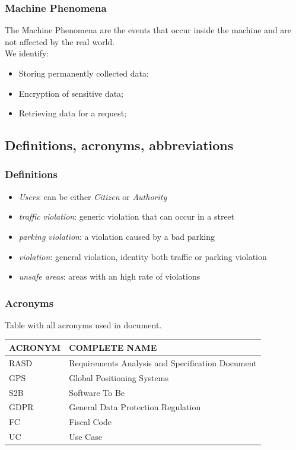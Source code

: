 \documentclass{article}
\begin{document}
\subsubsection{Machine Phenomena}
The Machine Phenomena are the events that occur inside the machine and are not affected by the real world.
\\We identify:
\begin{itemize}
    \item Storing permanently collected data;
    \item Encryption of sensitive data;
    \item Retrieving data for a request; 
\end{itemize} 

\subsection{Definitions, acronyms, abbreviations}

\subsubsection{Definitions}
\begin{itemize}
    \item \textit{Users}: can be either \textit{Citizen} or \textit{Authority}
    \item \textit{traffic violation}: generic violation that can occur in a street
    \item \textit{parking violation}: a violation caused by a bad parking
    \item \textit{violation}: general violation, identity both traffic or parking violation
    \item \textit{unsafe areas}: areas with an high rate of violations
\end{itemize}

\subsubsection{Acronyms}
Table with all acronyms used in document.
\begin{center}
\begin{tabular}{ | l | l |}
    \hline
    ACRONYM & COMPLETE NAME \\
    \hline
    RASD & Requirements Analysis and Specification Document \\
    \hline
    GPS & Global Positioning Systems \\
    \hline
    S2B & Software To Be \\
    \hline
    GDPR & General Data Protection Regulation \\
    \hline 
    FC & Fiscal Code \\
    \hline
    UC & Use Case \\
    \hline
\end{tabular}
\end{center}
\end{document}
